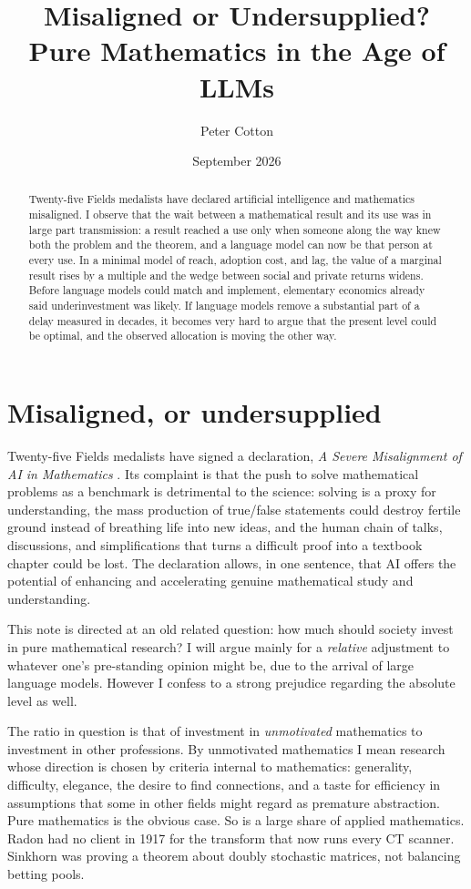 \documentclass[11pt]{article}
\title{\textbf{Misaligned or Undersupplied?\\ Pure Mathematics in the Age of LLMs}}
\author{Peter Cotton}
\date{September 2026}
\theoremstyle{definition}
\theoremstyle{remark}
\begin{document}
\maketitle

\begin{abstract}
Twenty-five Fields medalists have declared artificial intelligence and mathematics misaligned. I observe that the wait between a mathematical result and its use was in large part transmission: a result reached a use only when someone along the way knew both the problem and the theorem, and a language model can now be that person at every use. In a minimal model of reach, adoption cost, and lag, the value of a marginal result rises by a multiple and the wedge between social and private returns widens. Before language models could match and implement, elementary economics already said underinvestment was likely. If language models remove a substantial part of a delay measured in decades, it becomes very hard to argue that the present level could be optimal, and the observed allocation is moving the other way.
\end{abstract}

\section{Misaligned, or undersupplied}

Twenty-five Fields medalists have signed a declaration, \emph{A Severe Misalignment of AI in Mathematics} \citep{avila2026}. Its complaint is that the push to solve mathematical problems as a benchmark is detrimental to the science: solving is a proxy for understanding, the mass production of true/false statements could destroy fertile ground instead of breathing life into new ideas, and the human chain of talks, discussions, and simplifications that turns a difficult proof into a textbook chapter could be lost. The declaration allows, in one sentence, that AI offers the potential of enhancing and accelerating genuine mathematical study and understanding.

This note is directed at an old related question: how much should society invest in pure mathematical research? I will argue mainly for a {\em relative} adjustment to whatever one's pre-standing opinion might be, due to the arrival of large language models. However I confess to a strong prejudice regarding the absolute level as well.

The ratio in question is that of investment in {\em unmotivated} mathematics to investment in other professions. By unmotivated mathematics I mean research whose direction is chosen by criteria internal to mathematics: generality, difficulty, elegance, the desire to find connections, and a taste for efficiency in assumptions that some in other fields might regard as premature abstraction. Pure mathematics is the obvious case. So is a large share of applied mathematics. Radon had no client in 1917 for the transform that now runs every CT scanner. Sinkhorn was proving a theorem about doubly stochastic matrices, not balancing betting pools.
\end{document}
